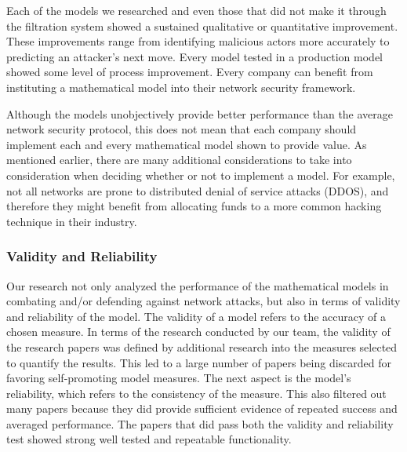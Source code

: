 \documentclass{article}
\begin{document}
Each of the models we researched and even those that did not make it through the filtration system showed a sustained qualitative or quantitative improvement. These improvements range from identifying malicious actors more accurately to predicting an attacker’s next move. Every model tested in a production model showed some level of process improvement. Every company can benefit from instituting a mathematical model into their network security framework. 

Although the models unobjectively provide better performance than the average network security protocol, this does not mean that each company should implement each and every mathematical model shown to provide value. As mentioned earlier, there are many additional considerations to take into consideration when deciding whether or not to implement a model. For example, not all networks are prone to distributed denial of service attacks (DDOS), and therefore they might benefit from allocating funds to a more common hacking technique in their industry. 

\subsubsection{Validity and Reliability}
Our research not only analyzed the performance of the mathematical models in combating and/or defending against network attacks, but also in terms of validity and reliability of the model. The validity of a model refers to the accuracy of a chosen measure. In terms of the research conducted by our team, the validity of the research papers was defined by additional research into the measures selected to quantify the results. This led to a large number of papers being discarded for favoring self-promoting model measures. The next aspect is the model’s reliability, which refers to the consistency of the measure. This also filtered out many papers because they did provide sufficient evidence of repeated success and averaged performance. The papers that did pass both the validity and reliability test showed strong well tested and repeatable functionality.
\end{document}

